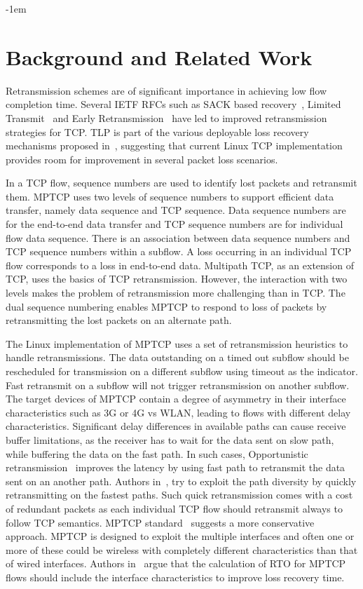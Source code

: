 \documentclass[10pt,conference,compsoc]{IEEEtran}
\begin{document}
\kern-1em
\section{Background and Related Work}\label{relwork}

Retransmission schemes are of significant importance in achieving low flow completion time. Several IETF RFCs such as SACK based recovery~\cite{rfc6675}, Limited Transmit~\cite{rfc3042} and Early Retransmission~\cite{rfc5827} have led to improved retransmission strategies for TCP. TLP is part of the various deployable loss recovery mechanisms proposed in~\cite{Flach:2013}, suggesting that current Linux TCP implementation provides room for improvement in several packet loss scenarios. 

In a TCP flow, sequence numbers are used to identify lost packets and retransmit them. MPTCP uses two levels of sequence numbers to support efficient data transfer, namely data sequence and TCP sequence. Data sequence numbers are for the end-to-end data transfer and TCP sequence numbers are for individual flow data sequence. There is an association between data sequence numbers and TCP sequence numbers within a subflow.  A loss occurring in an individual TCP flow corresponds to a loss in end-to-end data. Multipath TCP, as an extension of TCP, uses the basics of TCP retransmission. However, the interaction with two levels makes the problem of retransmission more challenging than in TCP. The dual sequence numbering enables MPTCP to respond to loss of packets by retransmitting the lost packets on an alternate path.  

The Linux implementation of MPTCP uses a set of retransmission heuristics to handle retransmissions. The data outstanding on a timed out subflow should be rescheduled for transmission on a different subflow using timeout as the indicator. Fast retransmit on a subflow will not trigger retransmission on another subflow. The target devices of MPTCP contain a degree of asymmetry in their interface characteristics such as 3G or 4G vs WLAN, leading to flows with different delay characteristics. Significant delay differences in available paths can cause receive buffer limitations, as the receiver has to wait for the data sent on slow path, while buffering the data on the fast path. In such cases, Opportunistic retransmission~\cite{Costin} improves the latency by using fast path to retransmit the data sent on an another path. Authors in~\cite{fuso}, try to exploit the path diversity by quickly retransmitting on the fastest paths. Such quick retransmission comes with a cost of redundant packets as each individual TCP flow should retransmit always to follow TCP semantics. MPTCP standard~\cite{rfc6824} suggests a more conservative approach. MPTCP is designed to exploit the multiple interfaces and often one or more of these could be wireless with completely different characteristics than that of wired interfaces. Authors in~\cite{Shin} argue that the calculation of RTO for MPTCP flows should include the interface characteristics to improve loss recovery time. 
\end{document}
